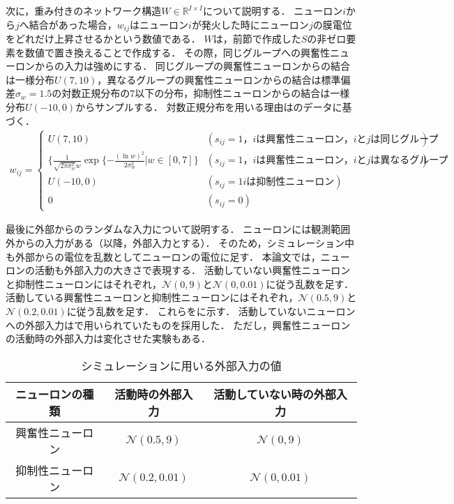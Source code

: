 次に，重み付きのネットワーク構造$W \in \mathbb{R}^{I \times I}$について説明する．
ニューロン$i$から$j$へ結合があった場合，$w_{ij}$はニューロン$i$が発火した時にニューロン$j$の膜電位をどれだけ上昇させるかという数値である．
$W$は，前節で作成した$S$の非ゼロ要素を数値で置き換えることで作成する．
その際，同じグループへの興奮性ニューロンからの入力は強めにする．
同じグループの興奮性ニューロンからの結合は一様分布$U(7,10)$，異なるグループの興奮性ニューロンからの結合は標準偏差$\sigma_w = 1.5$の対数正規分布の$7$以下の分布，抑制性ニューロンからの結合は一様分布$U(-10,0)$からサンプルする．
対数正規分布を用いる理由は\cite{Song}のデータに基づく．
\begin{align}
	w_{ij} = \begin{cases}
		U(7,10) & (s_{ij} = 1 \text{，$i$は興奮性ニューロン，$i$と$j$は同じグループ}) \\
		\{\frac{1}{\sqrt{2 \pi \sigma_w^2}w} \exp \{ - \frac{(\ln w)^2}{2 \sigma_w^2} | w \in [0,7]\} & (s_{ij} = 1 \text{，$i$は興奮性ニューロン，$i$と$j$は異なるグループ}) \\
		U(-10,0) & (s_{ij} = 1 \text{$i$は抑制性ニューロン}) \\
		0 & (s_{ij} = 0)
  \end{cases}
	\label{eq:W}
\end{align}

最後に外部からのランダムな入力について説明する．
ニューロンには観測範囲外からの入力がある（以降，外部入力とする）．
そのため，シミュレーション中も外部からの電位を乱数としてニューロンの電位に足す．
本論文では，ニューロンの活動も外部入力の大きさで表現する．
活動していない興奮性ニューロンと抑制性ニューロンにはそれぞれ，$\mathcal{N}(0,9)$と$\mathcal{N}(0,0.01)$に従う乱数を足す．
活動している興奮性ニューロンと抑制性ニューロンにはそれぞれ，$\mathcal{N}(0.5, 9)$と$\mathcal{N}(0.2,0.01)$に従う乱数を足す．
これらをに示す．
活動していないニューロンへの外部入力は\cite{Izhikevich2003}で用いられていたものを採用した．
ただし，興奮性ニューロンの活動時の外部入力は変化させた実験もある．

\begin{table}[htb]
  \center
  \begin{tabular}{|c|cc|} \hline
    ニューロンの種類 & 活動時の外部入力 & 活動していない時の外部入力 \\ \hline
		興奮性ニューロン & $\mathcal{N}(0.5,9)$ & $\mathcal{N}(0, 9)$ \\
		抑制性ニューロン & $\mathcal{N}(0.2, 0.01)$ & $\mathcal{N}(0, 0.01)$ \\ \hline
  \end{tabular}
  \caption{シミュレーションに用いる外部入力の値}
  \label{tab:parameter3}
\end{table}

